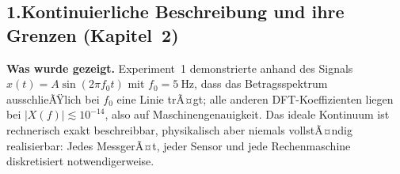 ﻿\documentclass[12pt,a4paper,titlepage]{report}
\begin{document}
\subsection*{1.\enspace Kontinuierliche Beschreibung und ihre Grenzen
(Kapitel~2)}

\textbf{Was wurde gezeigt.}
Experiment~1 demonstrierte anhand des Signals
$x(t)=A\sin(2\pi f_0 t)$ mit $f_0=\SI{5}{\hertz}$, dass das
Betragsspektrum ausschlieÃŸlich bei $f_0$ eine Linie trÃ¤gt;
alle anderen DFT-Koeffizienten liegen bei $|X(f)|\lesssim10^{-14}$,
also auf Maschinengenauigkeit.
Das ideale Kontinuum ist rechnerisch exakt beschreibbar, physikalisch
aber niemals vollstÃ¤ndig realisierbar: Jedes MessgerÃ¤t, jeder Sensor
und jede Rechenmaschine diskretisiert notwendigerweise.
\end{document}
